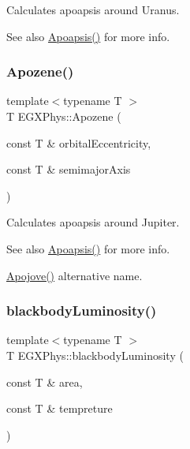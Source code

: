 Calculates apoapsis around Uranus. 

\begin{DoxySeeAlso}{See also}
\hyperlink{group___astrophysics_gaf962e650bf84a568458e8eb39b1c61ba}{Apoapsis()} for more info. 
\end{DoxySeeAlso}
\mbox{\label{group___astrophysics_ga44d3dd8d8b350d053b25b7b1f1e15534}} 
\subsubsection{\texorpdfstring{Apozene()}{Apozene()}}
{\footnotesize\ttfamily template$<$typename T $>$ \\
T E\+G\+X\+Phys\+::\+Apozene (\begin{DoxyParamCaption}\item[{const T \&}]{orbital\+Eccentricity,  }\item[{const T \&}]{semimajor\+Axis }\end{DoxyParamCaption})}



Calculates apoapsis around Jupiter. 

\begin{DoxySeeAlso}{See also}
\hyperlink{group___astrophysics_gaf962e650bf84a568458e8eb39b1c61ba}{Apoapsis()} for more info. 

\hyperlink{group___astrophysics_ga5a45d0a873514113aaa0adc95aefbbde}{Apojove()} alternative name. 
\end{DoxySeeAlso}
\mbox{\label{group___astrophysics_ga909f82edfaed449b44e94788b642ebb8}} 
\subsubsection{\texorpdfstring{blackbody\+Luminosity()}{blackbodyLuminosity()}}
{\footnotesize\ttfamily template$<$typename T $>$ \\
T E\+G\+X\+Phys\+::blackbody\+Luminosity (\begin{DoxyParamCaption}\item[{const T \&}]{area,  }\item[{const T \&}]{tempreture }\end{DoxyParamCaption})}



